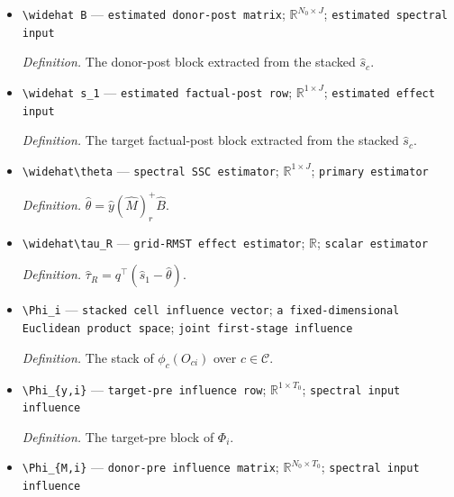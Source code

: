 \documentclass{article}
\begin{document}
\begin{itemize}
  \par\smallskip\noindent\emph{Definition.} The donor-pre block extracted from the stacked \(\widehat s_c\).
  \item \texttt{\textbackslash{}\allowbreak{}widehat B} --- \texttt{estimated donor-\allowbreak{}post matrix}; \(\mathbb R^{N_0\times J}\); \texttt{estimated spectral input}
  \par\smallskip\noindent\emph{Definition.} The donor-post block extracted from the stacked \(\widehat s_c\).
  \item \texttt{\textbackslash{}\allowbreak{}widehat s\_\allowbreak{}1} --- \texttt{estimated factual-\allowbreak{}post row}; \(\mathbb R^{1\times J}\); \texttt{estimated effect input}
  \par\smallskip\noindent\emph{Definition.} The target factual-post block extracted from the stacked \(\widehat s_c\).
  \item \texttt{\textbackslash{}\allowbreak{}widehat\textbackslash{}\allowbreak{}theta} --- \texttt{spectral SSC estimator}; \(\mathbb R^{1\times J}\); \texttt{primary estimator}
  \par\smallskip\noindent\emph{Definition.} \(\widehat\theta=\widehat y(\widehat M)_r^+\widehat B\).
  \item \texttt{\textbackslash{}\allowbreak{}widehat\textbackslash{}\allowbreak{}tau\_\allowbreak{}R} --- \texttt{grid-\allowbreak{}RMST effect estimator}; \(\mathbb R\); \texttt{scalar estimator}
  \par\smallskip\noindent\emph{Definition.} \(\widehat\tau_R=q^\top(\widehat s_1-\widehat\theta)\).
  \item \texttt{\textbackslash{}\allowbreak{}Phi\_\allowbreak{}i} --- \texttt{stacked cell influence vector}; \texttt{a fixed-\allowbreak{}dimensional Euclidean product space}; \texttt{joint first-\allowbreak{}stage influence}
  \par\smallskip\noindent\emph{Definition.} The stack of \(\phi_c(O_{ci})\) over \(c\in\mathcal C\).
  \item \texttt{\textbackslash{}\allowbreak{}Phi\_\allowbreak{}\{y,\allowbreak{}i\}\allowbreak{}} --- \texttt{target-\allowbreak{}pre influence row}; \(\mathbb R^{1\times T_0}\); \texttt{spectral input influence}
  \par\smallskip\noindent\emph{Definition.} The target-pre block of \(\Phi_i\).
  \item \texttt{\textbackslash{}\allowbreak{}Phi\_\allowbreak{}\{M,\allowbreak{}i\}\allowbreak{}} --- \texttt{donor-\allowbreak{}pre influence matrix}; \(\mathbb R^{N_0\times T_0}\); \texttt{spectral input influence}

\end{itemize}
\end{document}
